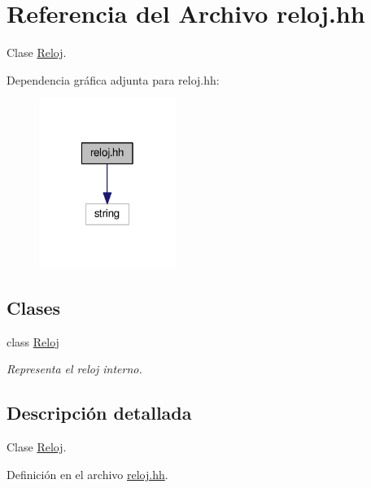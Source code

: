 \hypertarget{reloj_8hh}{\section{Referencia del Archivo reloj.\-hh}
\label{reloj_8hh}
}


Clase \hyperlink{class_reloj}{Reloj}.  


Dependencia gráfica adjunta para reloj.\-hh\-:
\nopagebreak
\begin{figure}[H]
\begin{center}
\leavevmode
\includegraphics[width=126pt]{reloj_8hh__incl}
\end{center}
\end{figure}
\subsection*{Clases}
\begin{DoxyCompactItemize}
\item 
class \hyperlink{class_reloj}{Reloj}
\begin{DoxyCompactList}\small\item\em Representa el reloj interno. \end{DoxyCompactList}\end{DoxyCompactItemize}


\subsection{Descripción detallada}
Clase \hyperlink{class_reloj}{Reloj}. 

Definición en el archivo \hyperlink{reloj_8hh_source}{reloj.\-hh}.

